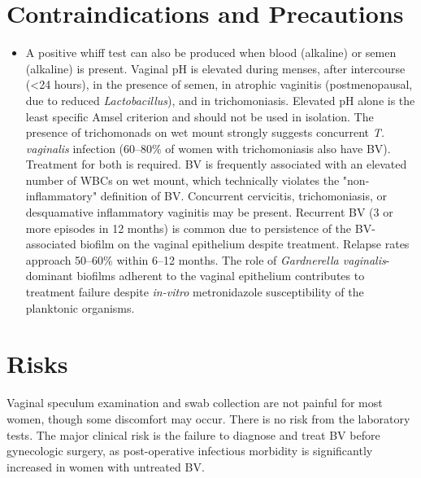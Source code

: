 \section*{Contraindications and Precautions}
\begin{itemize}
  \item A positive whiff test can also be produced when blood (alkaline) or semen (alkaline) is present. Vaginal pH is elevated during menses, after intercourse (<24 hours), in the presence of semen, in atrophic vaginitis (postmenopausal, due to reduced \textit{Lactobacillus}), and in trichomoniasis. Elevated pH alone is the least specific Amsel criterion and should not be used in isolation. The presence of trichomonads on wet mount strongly suggests concurrent \textit{T. vaginalis} infection (60--80\% of women with trichomoniasis also have BV). Treatment for both is required. BV is frequently associated with an elevated number of WBCs on wet mount, which technically violates the "non-inflammatory" definition of BV. Concurrent cervicitis, trichomoniasis, or desquamative inflammatory vaginitis may be present. Recurrent BV (3 or more episodes in 12 months) is common due to persistence of the BV-associated biofilm on the vaginal epithelium despite treatment. Relapse rates approach 50--60\% within 6--12 months. The role of \textit{Gardnerella vaginalis}-dominant biofilms adherent to the vaginal epithelium contributes to treatment failure despite \textit{in-vitro} metronidazole susceptibility of the planktonic organisms.
\end{itemize}
\section*{Risks}
Vaginal speculum examination and swab collection are not painful for most women, though some discomfort may occur. There is no risk from the laboratory tests. The major clinical risk is the failure to diagnose and treat BV before gynecologic surgery, as post-operative infectious morbidity is significantly increased in women with untreated BV.

